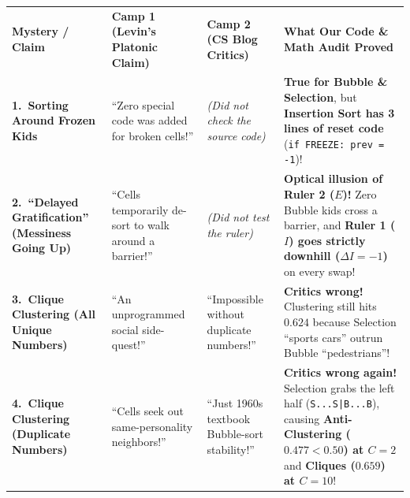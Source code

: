 \documentclass[10pt,a4paper]{article}
\begin{document}
\noindent
\renewcommand{\arraystretch}{1.32}
\begin{tabular}{>{\raggedright\arraybackslash\sffamily\bfseries\scriptsize\color{navybg}}p{} >{\raggedright\arraybackslash\scriptsize\color{slateink}}p{} >{\raggedright\arraybackslash\scriptsize\color{slateink}}p{} >{\raggedright\arraybackslash\scriptsize\color{slateink}}p{}}
  \rowcolor{navybg}
  \textcolor{goldaccent}{\sffamily\bfseries Mystery / Claim} &
  \textcolor{cyanaccent}{\sffamily\bfseries Camp 1 (Levin's Platonic Claim)} &
  \textcolor{selectborder}{\sffamily\bfseries Camp 2 (CS Blog Critics)} &
  \textcolor{insertborder}{\sffamily\bfseries What Our Code \& Math Audit Proved} \\
  \rowcolor{softgray}
  1.\ Sorting Around Frozen Kids &
  ``Zero special code was added for broken cells!'' &
  \emph{(Did not check the source code)} &
  \textbf{True for Bubble \& Selection}, but \textbf{Insertion Sort has 3 lines of reset code} (\texttt{if FREEZE: prev = -1})! \\
  \rowcolor{cardgray}
  2.\ ``Delayed Gratification'' (Messiness Going Up) &
  ``Cells temporarily de-sort to walk around a barrier!'' &
  \emph{(Did not test the ruler)} &
  \textbf{Optical illusion of Ruler 2 ($E$)!} Zero Bubble kids cross a barrier, and \textbf{Ruler 1 ($I$) goes strictly downhill ($\Delta I = -1$)} on every swap! \\
  \rowcolor{softgray}
  3.\ Clique Clustering (All Unique Numbers) &
  ``An unprogrammed social side-quest!'' &
  ``Impossible without duplicate numbers!'' &
  \textbf{Critics wrong!} Clustering still hits $\mathbf{0.624}$ because Selection ``sports cars'' outrun Bubble ``pedestrians''! \\
  \rowcolor{cardgray}
  4.\ Clique Clustering (Duplicate Numbers) &
  ``Cells seek out same-personality neighbors!'' &
  ``Just 1960s textbook Bubble-sort stability!'' &
  \textbf{Critics wrong again!} Selection grabs the left half (\texttt{S...S|B...B}), causing \textbf{Anti-Clustering ($0.477 < 0.50$) at $C=2$} and \textbf{Cliques ($0.659$) at $C=10$}! \\
\end{tabular}
\end{document}
